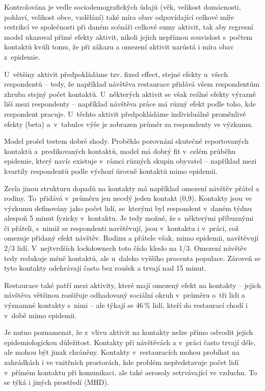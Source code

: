 Kontrolována je vedle sociodemografických údajů (věk, velikost domácnosti, pohlaví, velikost obce, vzdělání) také míra obav odpovídající celkové míře restrikcí ve společnosti při daném scénáři celkové sumy aktivit, tak aby regresní model ukazoval přímé efekty aktivit, nikoli jejich nepřímou souvislost s počtem kontaktů kvůli tomu, že při zákazu a omezení aktivit narůstá i míra obav z epidemie.

U~většiny aktivit předpokládáme tzv. fixed effect, stejné efekty u~všech respondentů – tedy, že například návštěva restaurace přidává všem respondentům zhruba stejný počet kontaktů. U některých aktivit se však reálné efekty výrazně liší mezi respondenty – například návštěva práce má různý efekt podle toho, kde respondent pracuje. U~těchto aktivit předpokládáme individuálně proměnlivé efekty (beta) a~v tabulce výše je zobrazen průměr za respondenty ve výzkumu.

Model prošel testem dobré shody. Proběhlo porovnání skutečně reportovaných kontaktů a predikovaných kontaktů, model má dobrý fit v celém průběhu epidemie, který navíc existuje v rámci různých skupin obyvatel – například mezi kvartily respondentů podle výchozí úrovně kontaktů mimo epidemii.
\vspace{1em}

\noindent Zcela jinou strukturu dopadů na kontakty má například omezení návštěv přátel a rodiny. To přidává v průměru jen necelý jeden kontakt (0,9). Kontakty jsou ve výzkumu definovány jako počet lidí, se kterými byl respondent v daném týdnu alespoň 5 minut fyzicky v kontaktu. Je tedy možné, že s některými příbuznými či přáteli, s nimiž se respondenti navštěvují, jsou v kontaktu i v práci, což omezuje přidaný efekt návštěv. Rodinu a přátele však, mimo epidemii, navštěvují 2/3 lidí. V nejtvrdších lockdownech toto číslo kleslo na 1/3. Omezení návštěv tedy redukuje méně kontaktů, ale u~daleko vyššího procenta populace. Zároveň se tyto kontakty odehrávají často bez roušek a trvají nad 15 minut. 

Restaurace také patří mezi aktivity, které mají omezený efekt na kontakty – jejich návštěva většinou rozšiřuje odhadovaný sociální okruh v průměru o~tři lidi a významné kontakty s nimi – ale týkají se 46\,\% lidí, kteří do restaurací chodí i v době mimo epidemii. 

Je nutno poznamenat, že z vlivu aktivit na kontakty nelze přímo odvodit jejich epidemiologickou důležitost. Kontakty při návštěvách a v práci často trvají déle, ale mohou být jinak chráněny. Kontakty v restauracích mohou probíhat na zahrádkách i ve vnitřních prostorách, kde problém nepředstavuje počet lidí v přímém kontaktu při komunikaci, ale také aerosoly setrvávající ve vzduchu. To se týká i jiných prostředí (MHD). 


